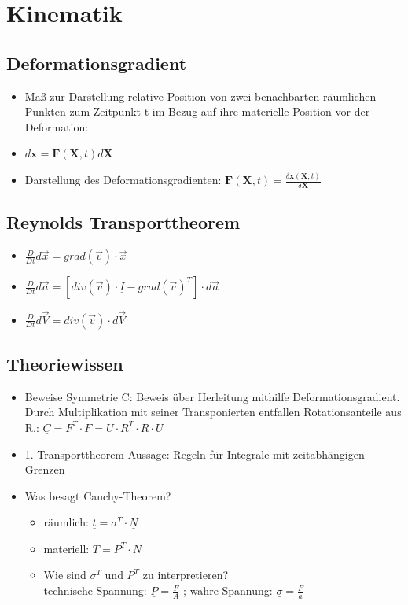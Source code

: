 \documentclass[fleqn,twoside]{article}
\begin{document}
\section{Kinematik}
\subsection{Deformationsgradient}
        \begin{itemize}
            \item Maß zur Darstellung relative Position von zwei benachbarten räumlichen Punkten zum Zeitpunkt t im Bezug auf ihre materielle Position vor der Deformation: 
            \item $d\textbf{x} = \textbf{F}(\textbf{X},t)d\textbf{X}$
            \item Darstellung des Deformationsgradienten: $\textbf{F}(\textbf{X},t) = \frac{\delta\textbf{x}(\textbf{X},t)}{\delta \textbf{X}}$
        \end{itemize}
\subsection{Reynolds Transporttheorem}
        \begin{itemize}
            \item $\frac{D}{Dt}d\vec{x} = grad(\vec{v})\cdot \vec{x}$
            \item $\frac{D}{Dt}d\vec{a} = \left[ div(\vec{v}) \cdot \underline{I} - grad(\vec{v})^T \right] \cdot d \vec{a}$
            \item $\frac{D}{Dt} d\vec{V} = div(\vec{v}) \cdot d\vec{V}$
        \end{itemize}
\subsection{Theoriewissen}
\begin{itemize}
    \item Beweise Symmetrie C: Beweis über Herleitung mithilfe Deformationsgradient. Durch Multiplikation mit seiner Transponierten entfallen Rotationsanteile aus R.: $\underline{C} = F^T \cdot F = U \cdot R^T \cdot R \cdot U$
    \item 1. Transporttheorem Aussage: Regeln für Integrale mit zeitabhängigen Grenzen
    \item Was besagt Cauchy-Theorem? 
        \begin{itemize}
            \item räumlich: $\underline{t} = \sigma^T \cdot \underline{N}$
            \item materiell: $\underline{T} = \underline{P}^T \cdot \underline{N}$
            \item Wie sind $\underline{\sigma}^T$ und $\underline{P}^T$ zu interpretieren?\\
            technische Spannung: $\underline{P}=\frac{F}{A}$ ; wahre Spannung: $\underline{\sigma}=\frac{F}{a}$
        \end{itemize}
\end{itemize}
\end{document}
